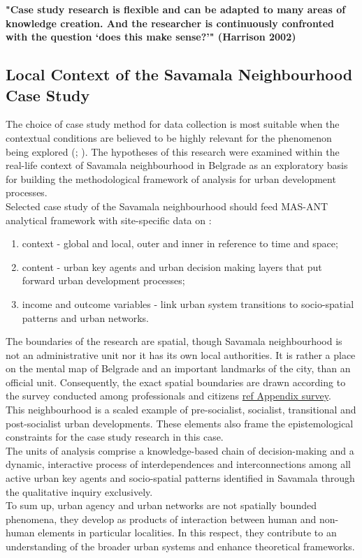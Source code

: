 \documentclass[11pt]{report}
\begin{document}
\textbf{"Case study research is flexible and can be adapted to many areas of knowledge creation. And the researcher is continuously confronted with the question ‘does this make sense?’" (Harrison 2002)}

\subsection{Local Context of the Savamala Neighbourhood Case Study}

The choice of case study method for data collection is most suitable when the  contextual  conditions  are  believed  to  be highly relevant for the phenomenon being explored (\cite{Robson, 1993}; \cite{Yin, 1994}). The hypotheses of this research were examined within the real-life context of Savamala neighbourhood in Belgrade as an exploratory basis for building the methodological framework of analysis for urban development processes. 
\\
Selected case study of the Savamala neighbourhood  should feed MAS-ANT analytical framework with site-specific data on :
\begin{enumerate}
\item context - global and local, outer and inner in reference to time and space;
\item content - urban key agents and urban decision making layers that put forward urban development processes;
\item income and outcome variables - link urban system transitions to socio-spatial patterns and urban networks.
\end{enumerate}

The boundaries of the research are spatial, though Savamala neighbourhood is not an administrative unit nor it has its own local authorities. It is rather a place on the mental map of Belgrade and an important landmarks of the city, than an official unit. Consequently, the exact spatial boundaries are drawn according to the survey conducted among professionals and citizens \href{ref}{ref Appendix survey}.
\\
This neighbourhood is a scaled example of pre-socialist, socialist, transitional and post-socialist urban developments. These elements also frame the epistemological constraints for the case study research in this case.
\\
The units of analysis comprise a knowledge-based chain of decision-making and a dynamic, interactive process of interdependences and interconnections among all active urban key agents and socio-spatial patterns identified in Savamala through the qualitative inquiry exclusively.
\\
To sum up, urban agency and urban networks are not spatially bounded phenomena, they develop as products of interaction between human and non-human elements in particular localities. In this respect, they contribute to an understanding of the broader urban systems and enhance theoretical frameworks. 
\end{document}
